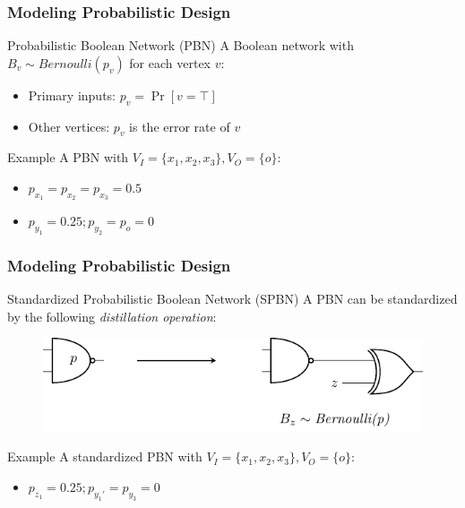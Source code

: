 \begin{frame}
  \frametitle{Modeling Probabilistic Design}
  \begin{block}{Probabilistic Boolean Network (PBN)}
    A Boolean network with $B_v\sim\textit{Bernoulli}(p_v)$ for each vertex $v$:
    \pause
    \begin{itemize}
      \item Primary inputs: $p_v=\Pr[v=\top]$
            \pause
      \item Other vertices: $p_v$ is the error rate of $v$
    \end{itemize}
  \end{block}
  \pause
  \begin{block}{Example}
    A PBN with $V_I=\{x_1,x_2,x_3\},V_O=\{o\}$:
    \begin{figure}
      \centering
      
    \end{figure}
    \pause
    \begin{itemize}
      \item $p_{x_1}=p_{x_2}=p_{x_3}=0.5$
            \pause
      \item $p_{y_1}=0.25;p_{y_2}=p_{o}=0$
    \end{itemize}
  \end{block}
\end{frame}

\begin{frame}
  \frametitle{Modeling Probabilistic Design}
  \begin{block}{Standardized Probabilistic Boolean Network (SPBN)}
    A PBN can be standardized by the following \textit{distillation operation}:
    \pause
    \begin{figure}
      \centering
      \includegraphics[scale=0.8]{fig/prob-distillation.pdf}
    \end{figure}
  \end{block}
  \pause
  \begin{block}{Example}
    A standardized PBN with $V_I=\{x_1,x_2,x_3\},V_O=\{o\}$:
    \begin{figure}
      \centering
      
    \end{figure}
    \pause
    \begin{itemize}
      \item $p_{z_1}=0.25;p_{y_1'}=p_{y_3}=0$
    \end{itemize}
  \end{block}
\end{frame}